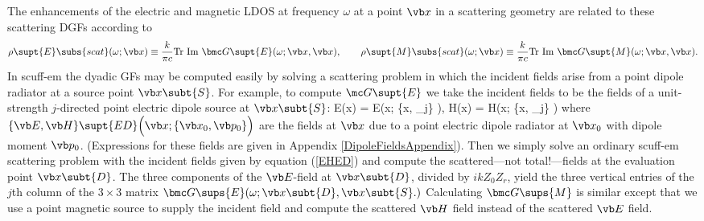 \documentclass[letterpaper]{article}
\begin{document}
The enhancements of the electric and magnetic LDOS at frequency $\omega$
at a point $\vb x$ in a scattering geometry are related to these
scattering DGFs according to
$$ \rho\supt{E}\subs{scat}(\omega; \vb x)
   \equiv
   \frac{k}{\pi c}\text{Tr }\text{Im } \bmc G\supt{E}(\omega; \vb x, \vb x),
   \qquad
   \rho\supt{M}\subs{scat}(\omega; \vb x)
   \equiv
   \frac{k}{\pi c}\text{Tr }\text{Im } \bmc G\supt{M}(\omega; \vb x, \vb x).
$$
In {\sc scuff-em} the dyadic GFs may be computed easily by solving a
scattering problem in which the incident fields arise from a point dipole
radiator at a source point $\vb x\subt{S}$.
For example, to compute $\mc G\supt{E}$ we take the incident fields 
to be the fields of a unit-strength $j$-directed point electric dipole 
source at $\vb x\subt{S}$:
{
 \vb E(\vb x) =
 \vb E\Big(\vb x; \{\vb x, _j\} \Big),
 \qquad
 \vb H(\vb x) =
 \vb H\Big(\vb x; \{\vb x, _j\} \Big)
}
where $\{\vb E, \vb H\}\supt{ED}\Big(\vb x; \{\vb x_0, \vb p_0\}\Big)$
are the fields at $\vb x$ due to a point electric dipole radiator
at $\vb x_0$ with dipole moment $\vb p_0$.
(Expressions for these fields are given in 
Appendix \ref{DipoleFieldsAppendix}).
Then we simply solve an ordinary {\sc scuff-em} scattering
problem with the incident fields given by equation 
(\ref{EHED}) and compute the scattered---not total!---fields
at the evaluation point $\vb x\subt{D}$. The three components of the
$\vb E$-field at $\vb x\subt{D}$, divided by $ikZ_0 Z_r$, yield the
three vertical entries of the $j$th column of the
$3\times 3$ matrix 
$\bmc G\sups{E}(\omega; \vb x\subt{D}, \vb x\subt{S}.)$
Calculating $\bmc G\sups{M}$ is similar except that we use 
a point magnetic source to supply the incident field 
and compute the scattered $\vb H$ field instead of the 
scattered $\vb E$ field.

\newpage
\end{document}
